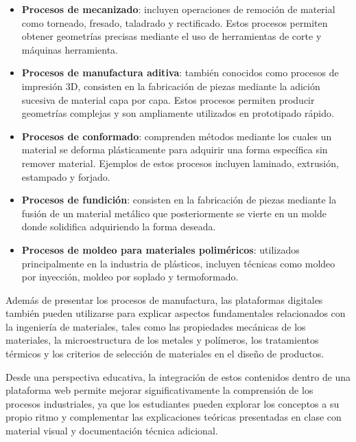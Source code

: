 \documentclass[12pt,letterpaper]{article}
\begin{document}
\begin{itemize}

\item \textbf{Procesos de mecanizado}: incluyen operaciones de remoción de material como torneado, fresado, taladrado y rectificado. Estos procesos permiten obtener geometrías precisas mediante el uso de herramientas de corte y máquinas herramienta.

\item \textbf{Procesos de manufactura aditiva}: también conocidos como procesos de impresión 3D, consisten en la fabricación de piezas mediante la adición sucesiva de material capa por capa. Estos procesos permiten producir geometrías complejas y son ampliamente utilizados en prototipado rápido.

\item \textbf{Procesos de conformado}: comprenden métodos mediante los cuales un material se deforma plásticamente para adquirir una forma específica sin remover material. Ejemplos de estos procesos incluyen laminado, extrusión, estampado y forjado.

\item \textbf{Procesos de fundición}: consisten en la fabricación de piezas mediante la fusión de un material metálico que posteriormente se vierte en un molde donde solidifica adquiriendo la forma deseada.

\item \textbf{Procesos de moldeo para materiales poliméricos}: utilizados principalmente en la industria de plásticos, incluyen técnicas como moldeo por inyección, moldeo por soplado y termoformado.

\end{itemize}

Además de presentar los procesos de manufactura, las plataformas digitales también pueden utilizarse para explicar aspectos fundamentales relacionados con la ingeniería de materiales, tales como las propiedades mecánicas de los materiales, la microestructura de los metales y polímeros, los tratamientos térmicos y los criterios de selección de materiales en el diseño de productos.

Desde una perspectiva educativa, la integración de estos contenidos dentro de una plataforma web permite mejorar significativamente la comprensión de los procesos industriales, ya que los estudiantes pueden explorar los conceptos a su propio ritmo y complementar las explicaciones teóricas presentadas en clase con material visual y documentación técnica adicional.
\end{document}
